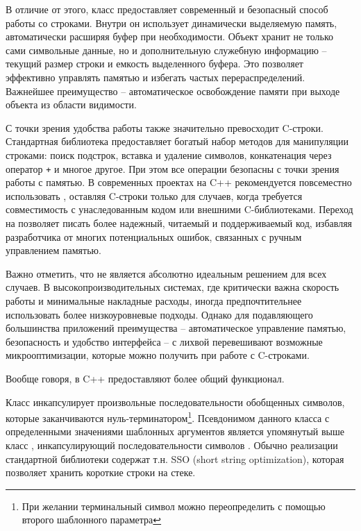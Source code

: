 В отличие от этого, класс  предоставляет современный и безопасный способ работы со строками. Внутри он использует динамически выделяемую память, 
автоматически расширяя буфер при необходимости. Объект  хранит не только сами символьные данные, но и дополнительную служебную информацию -- текущий 
размер строки и емкость выделенного буфера. Это позволяет эффективно управлять памятью и избегать частых перераспределений. Важнейшее преимущество  -- 
автоматическое освобождение памяти при выходе объекта из области видимости.

С точки зрения удобства работы  также значительно превосходит C-строки. Стандартная библиотека предоставляет богатый набор методов для манипуляции 
строками: поиск подстрок, вставка и удаление символов, конкатенация через оператор \verb|+| и многое другое. При этом все операции безопасны с точки зрения работы с памятью. 
В современных проектах на C++ рекомендуется повсеместно использовать , оставляя C-строки только для случаев, когда требуется совместимость с 
унаследованным кодом или внешними C-библиотеками. Переход на  позволяет писать более надежный, читаемый и поддерживаемый код, избавляя разработчика от 
многих потенциальных ошибок, связанных с ручным управлением памятью.

Важно отметить, что  не является абсолютно идеальным решением для всех случаев. В высокопроизводительных системах, где критически важна скорость работы и 
минимальные накладные расходы, иногда предпочтительнее использовать более низкоуровневые подходы. Однако для подавляющего большинства приложений преимущества 
-- автоматическое управление памятью, безопасность и удобство интерфейса -- с лихвой перевешивают возможные микрооптимизации, которые можно получить при работе с C-строками.

Вообще говоря, в C++  предоставляют более общий функционал.

Класс  инкапсулирует произвольные последовательности
обобщенных символов, которые заканчиваются нуль-терминатором\footnote{При желании терминальный символ можно
переопределить с помощью второго шаблонного параметра}. Псевдонимом данного класса с определенными значениями
шаблонных аргументов является упомянутый выше класс ,
инкапсулирующий последовательности символов . Обычно реализации
стандартной библиотеки содержат т.н. SSO (short string optimization), которая позволяет хранить короткие строки на стеке.

